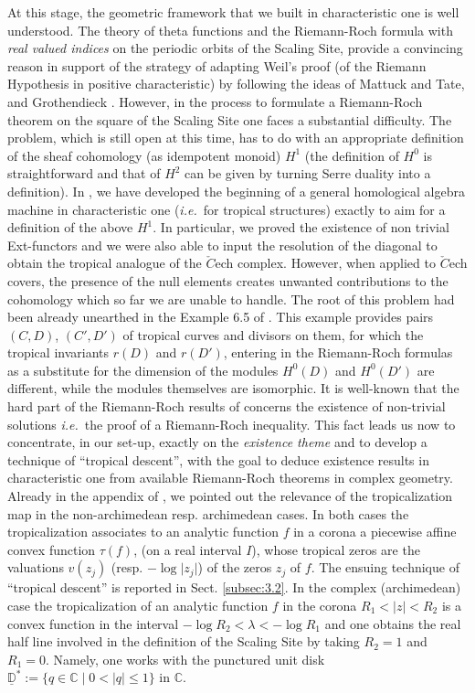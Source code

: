 \documentclass[graybox, envcountsect%
]{svmult}
\def\C{{\mathbb C}}
\def\D{{\mathbb D}}
\def\dst{{\underline \D^*}}
\newcommand{\ie}{{\it i.e.\/}\ }
\def\no{\noindent}
\begin{document}
\no At this stage, the geometric framework that we built in characteristic one is well understood. The theory of theta functions and the Riemann-Roch formula with \emph{real valued indices} on the periodic orbits of the Scaling Site, provide a convincing reason in support of the strategy of adapting Weil's proof (of the Riemann Hypothesis in positive characteristic) by following the ideas of Mattuck and Tate, and Grothendieck \cite{grmt,Crh}. However, in the process to formulate a Riemann-Roch theorem on the square of the Scaling Site one faces a substantial difficulty. The problem, which
 is still open at this time, has to do with an appropriate definition of the sheaf cohomology (as idempotent monoid) $H^1$ (the definition of $H^0$ is straightforward and that of $H^2$ can be given  by turning Serre duality into a definition). In \cite{CC5}, we have developed the beginning of a general homological algebra machine in characteristic one (\ie for tropical structures) exactly to aim for a definition of the above $H^1$. In particular, we proved the existence of non trivial Ext-functors  and we were also able  to input the resolution of the diagonal to obtain the tropical analogue of the $\check C$ech complex.
  However, when applied to $\check C$ech covers, the presence of the null elements creates unwanted contributions to the cohomology which so far we are unable to handle. The root of this problem had been already unearthed in the Example 6.5 of \cite{yoshi}. This example provides pairs $(C,D)$, $(C',D')$ of tropical curves and divisors on them, for which the tropical invariants $r(D)$ and $r(D')$, entering in the Riemann-Roch formulas \cite{BN,gathmannrr} as a substitute for the dimension of the modules $H^0(D)$ and $H^0(D')$ are different, while the modules themselves  are isomorphic.\newline
    It is well-known that the hard part of the Riemann-Roch results of \cite{BN,gathmannrr} concerns the existence of non-trivial solutions \ie the proof of a Riemann-Roch inequality. This fact leads us now to concentrate, in our set-up, exactly on the \emph{existence theme} and to develop a technique of ``tropical descent'', with the goal to deduce existence results in characteristic one from available Riemann-Roch theorems in complex geometry.\newline
    Already in the appendix of \cite{CC4}, we pointed out the relevance of the tropicalization map in the non-archimedean resp. archimedean cases. In both cases the tropicalization associates to an analytic function $f$ in a corona a piecewise affine convex function $\tau(f)$, (on a real interval $I$), whose tropical zeros are the valuations $v(z_j)$ (resp. $-\log\vert z_j\vert $) of the zeros $z_j$ of $f$. The ensuing technique of ``tropical descent'' is reported in Sect.  \ref{subsec:3.2}. In the complex (archimedean) case the tropicalization of an analytic function $f$ in the  corona $R_1< \vert z\vert <R_2$ is a convex function in the interval $-\log R_2 < \lambda < -\log R_1$ and one obtains the real half line involved in the definition of  the Scaling Site by taking 
 $R_2=1$ and $R_1=0$. Namely, one works with the punctured unit disk $\dst:=\{q\in \C\mid 0<\vert q\vert \leq 1\}$ in $\C$.
 
\end{document}
